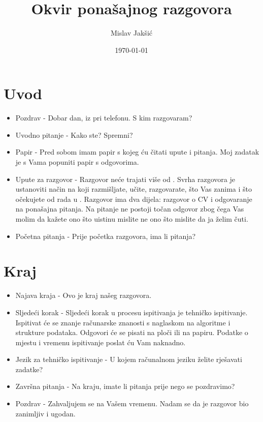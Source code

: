 \documentclass{article}
\title{Okvir ponašajnog razgovora}
\author{Mislav Jakšić}
\date{\today}
\begin{document}
\maketitle



\section{Uvod}

\begin{itemize}
  \item Pozdrav - Dobar dan,  iz  pri telefonu. S kim razgovaram?
  \item Uvodno pitanje - Kako ste? Spremni?
  \item Papir - Pred sobom imam papir s kojeg ću čitati upute i pitanja. Moj zadatak je s Vama popuniti papir s odgovorima.
  \item Upute za razgovor - Razgovor neće trajati više od . Svrha razgovora je ustanoviti način na koji razmišljate, učite, razgovarate, što Vas zanima i što očekujete od rada u . Razgovor ima dva dijela: razgovor o CV i odgovaranje na ponašajna pitanja. Na pitanje ne postoji točan odgovor zbog čega Vas molim da kažete ono što uistinu mislite ne ono što mislite da ja želim čuti.
  \item Početna pitanja - Prije početka razgovora, ima li pitanja?
\end{itemize}



\newpage
\section{Kraj}

\begin{itemize}
  \item Najava kraja - Ovo je kraj našeg razgovora.
  \item Sljedeći korak - Sljedeći korak u procesu ispitivanja je tehničko ispitivanje. Ispitivat će se znanje računarske znanosti s naglaskom na algoritme i strukture podataka. Odgovori će se pisati na ploči ili na papiru. Podatke o mjestu i vremenu ispitivanje poslat ću Vam naknadno.
  \item Jezik za tehničko ispitivanje - U kojem računalnom jeziku želite rješavati zadatke?
  \item Završna pitanja - Na kraju, imate li pitanja prije nego se pozdravimo?
  \item Pozdrav - Zahvaljujem se na Vašem vremenu. Nadam se da je razgovor bio zanimljiv i ugodan.
\end{itemize}
\end{document}
